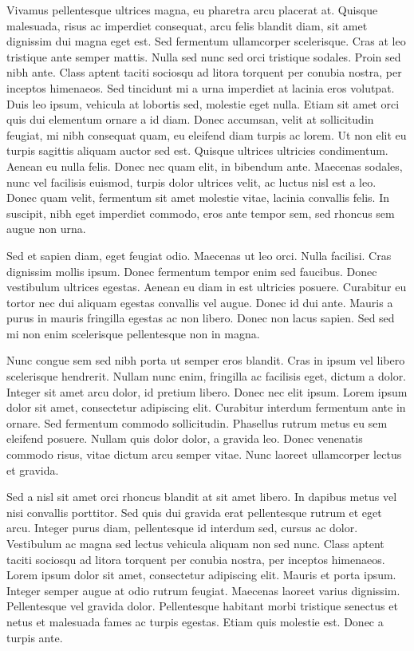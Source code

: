 Vivamus pellentesque ultrices magna, eu pharetra arcu placerat at. Quisque malesuada, risus ac imperdiet consequat, arcu felis blandit diam, sit amet dignissim dui magna eget est. Sed fermentum ullamcorper scelerisque. Cras at leo tristique ante semper mattis. Nulla sed nunc sed orci tristique sodales. Proin sed nibh ante. Class aptent taciti sociosqu ad litora torquent per conubia nostra, per inceptos himenaeos. Sed tincidunt mi a urna imperdiet at lacinia eros volutpat. Duis leo ipsum, vehicula at lobortis sed, molestie eget nulla. Etiam sit amet orci quis dui elementum ornare a id diam. Donec accumsan, velit at sollicitudin feugiat, mi nibh consequat quam, eu eleifend diam turpis ac lorem. Ut non elit eu turpis sagittis aliquam auctor sed est. Quisque ultrices ultricies condimentum. Aenean eu nulla felis. Donec nec quam elit, in bibendum ante. Maecenas sodales, nunc vel facilisis euismod, turpis dolor ultrices velit, ac luctus nisl est a leo. Donec quam velit, fermentum sit amet molestie vitae, lacinia convallis felis. In suscipit, nibh eget imperdiet commodo, eros ante tempor sem, sed rhoncus sem augue non urna.

Sed et sapien diam, eget feugiat odio. Maecenas ut leo orci. Nulla facilisi. Cras dignissim mollis ipsum. Donec fermentum tempor enim sed faucibus. Donec vestibulum ultrices egestas. Aenean eu diam in est ultricies posuere. Curabitur eu tortor nec dui aliquam egestas convallis vel augue. Donec id dui ante. Mauris a purus in mauris fringilla egestas ac non libero. Donec non lacus sapien. Sed sed mi non enim scelerisque pellentesque non in magna.

Nunc congue sem sed nibh porta ut semper eros blandit. Cras in ipsum vel libero scelerisque hendrerit. Nullam nunc enim, fringilla ac facilisis eget, dictum a dolor. Integer sit amet arcu dolor, id pretium libero. Donec nec elit ipsum. Lorem ipsum dolor sit amet, consectetur adipiscing elit. Curabitur interdum fermentum ante in ornare. Sed fermentum commodo sollicitudin. Phasellus rutrum metus eu sem eleifend posuere. Nullam quis dolor dolor, a gravida leo. Donec venenatis commodo risus, vitae dictum arcu semper vitae. Nunc laoreet ullamcorper lectus et gravida.

Sed a nisl sit amet orci rhoncus blandit at sit amet libero. In dapibus metus vel nisi convallis porttitor. Sed quis dui gravida erat pellentesque rutrum et eget arcu. Integer purus diam, pellentesque id interdum sed, cursus ac dolor. Vestibulum ac magna sed lectus vehicula aliquam non sed nunc. Class aptent taciti sociosqu ad litora torquent per conubia nostra, per inceptos himenaeos. Lorem ipsum dolor sit amet, consectetur adipiscing elit. Mauris et porta ipsum. Integer semper augue at odio rutrum feugiat. Maecenas laoreet varius dignissim. Pellentesque vel gravida dolor. Pellentesque habitant morbi tristique senectus et netus et malesuada fames ac turpis egestas. Etiam quis molestie est. Donec a turpis ante.

